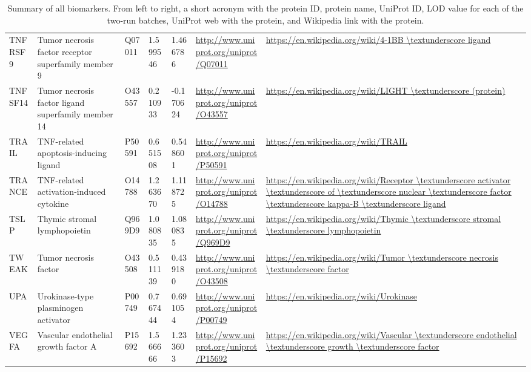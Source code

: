 \begin{table}[H]
{\begin{tabular}{ lllllll }
        \multicolumn{1}{l|}{ TNFRSF9 } &  Tumor necrosis factor receptor superfamily member 9   & Q07011   & 1.599546   & 1.466786   & \url{http://www.uniprot.org/uniprot/Q07011}   & \url{https://en.wikipedia.org/wiki/4-1BB \textunderscore ligand}          \\ 
        \multicolumn{1}{l|}{ TNFSF14 } &  Tumor necrosis factor ligand superfamily member 14   & O43557   & 0.210933   & -0.170624   & \url{http://www.uniprot.org/uniprot/O43557}   & \url{https://en.wikipedia.org/wiki/LIGHT \textunderscore (protein)}          \\ 
        \multicolumn{1}{l|}{ TRAIL } &  TNF-related apoptosis-inducing ligand   & P50591   & 0.651508   & 0.548601   & \url{http://www.uniprot.org/uniprot/P50591}   & \url{https://en.wikipedia.org/wiki/TRAIL}          \\ 
        \multicolumn{1}{l|}{ TRANCE } &  TNF-related activation-induced cytokine   & O14788   & 1.263670   & 1.118725   & \url{http://www.uniprot.org/uniprot/O14788}   & \url{https://en.wikipedia.org/wiki/Receptor \textunderscore activator \textunderscore of \textunderscore nuclear \textunderscore factor \textunderscore kappa-B \textunderscore ligand}          \\ 
        \multicolumn{1}{l|}{ TSLP } &  Thymic stromal lymphopoietin   & Q969D9   & 1.080835   & 1.080835   & \url{http://www.uniprot.org/uniprot/Q969D9}   & \url{https://en.wikipedia.org/wiki/Thymic \textunderscore stromal \textunderscore lymphopoietin}          \\ 
        \multicolumn{1}{l|}{ TWEAK } &  Tumor necrosis factor   & O43508   & 0.511139   & 0.439180   & \url{http://www.uniprot.org/uniprot/O43508}   & \url{https://en.wikipedia.org/wiki/Tumor \textunderscore necrosis \textunderscore factor}          \\ 
        \multicolumn{1}{l|}{ UPA } &  Urokinase-type plasminogen activator   & P00749   & 0.767444   & 0.691054   & \url{http://www.uniprot.org/uniprot/P00749}   & \url{https://en.wikipedia.org/wiki/Urokinase}          \\ 
        \multicolumn{1}{l|}{ VEGFA } &  Vascular endothelial growth factor A   & P15692   & 1.566666   & 1.233603   & \url{http://www.uniprot.org/uniprot/P15692}   & \url{https://en.wikipedia.org/wiki/Vascular \textunderscore endothelial \textunderscore growth \textunderscore factor}          \\ 

    \end{tabular}
 } 
 
    \caption{Summary of all biomarkers. From left to right, a short acronym with the protein ID, protein name, UniProt ID, LOD value for each of the two-run batches, UniProt web with the protein, and Wikipedia link with the protein.}
    \label{table:SuplementaryAllBiomarkers}

\end{table}

